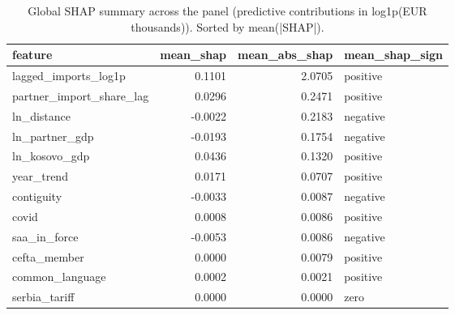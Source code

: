 \begin{table}
\caption{Global SHAP summary across the panel (predictive contributions in log1p(EUR thousands)). Sorted by mean(|SHAP|).}
\label{tbl:ch4-shap-global}
\begin{tabular}{lrrl}
\toprule
feature & mean\_shap & mean\_abs\_shap & mean\_shap\_sign \\
\midrule
lagged\_imports\_log1p & 0.1101 & 2.0705 & positive \\
partner\_import\_share\_lag & 0.0296 & 0.2471 & positive \\
ln\_distance & -0.0022 & 0.2183 & negative \\
ln\_partner\_gdp & -0.0193 & 0.1754 & negative \\
ln\_kosovo\_gdp & 0.0436 & 0.1320 & positive \\
year\_trend & 0.0171 & 0.0707 & positive \\
contiguity & -0.0033 & 0.0087 & negative \\
covid & 0.0008 & 0.0086 & positive \\
saa\_in\_force & -0.0053 & 0.0086 & negative \\
cefta\_member & 0.0000 & 0.0079 & positive \\
common\_language & 0.0002 & 0.0021 & positive \\
serbia\_tariff & 0.0000 & 0.0000 & zero \\
\bottomrule
\end{tabular}
\end{table}
